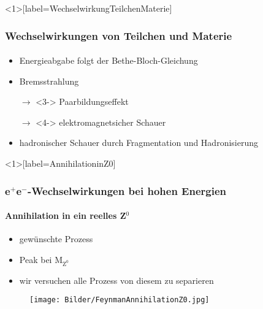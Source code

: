 \documentclass{beamer}
\newcommand{\citeS}[1]{\textsuperscript{\cite{#1}}}
\begin{document}

\begin{frame}<1>[label=WechselwirkungTeilchenMaterie]
	\frametitle{Wechselwirkungen von Teilchen und Materie}
	\framesubtitle{}
	\begin{itemize}
		\item Energieabgabe folgt der Bethe-Bloch-Gleichung
		\item<2-> Bremsstrahlung
		\item[$\rightarrow$]<3-> Paarbildungseffekt 
		\item[$\rightarrow$]<4-> elektromagnetsicher Schauer 
		\item<5> hadronischer Schauer durch Fragmentation und Hadronisierung
	\end{itemize}
\end{frame}


\begin{frame}<1>[label=AnnihilationinZ0]
	\frametitle{e$^+$e$^-$-Wechselwirkungen bei hohen Energien}
	\framesubtitle{Annihilation in ein reelles Z$^0$}
	\begin{itemize}
		\item gewünschte Prozess
		\item Peak bei M$_{\text{Z}^0}$
		\item wir versuchen alle Prozess von diesem zu separieren
	\end{itemize}
	\begin{figure}
	\centering
	\texttt{[image: Bilder/FeynmanAnnihilationZ0.jpg]}
	\end{figure}
\end{frame}
\end{document}

